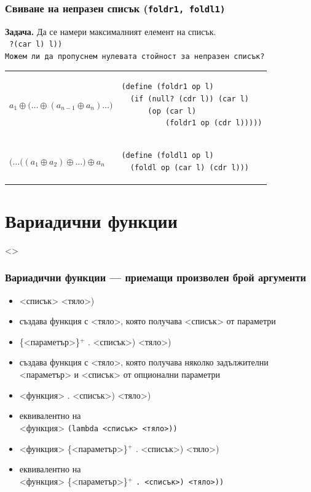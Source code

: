 \documentclass[alsotrans,beameroptions={aspectratio=169}]{beamerswitch}
\begin{document}
\begin{frame}[fragile]
  \frametitle{Свиване на непразен списък (\tt{foldr1, foldl1})}

  \textbf{Задача.} Да се намери максималният елемент на списък.\\
  \pause
  \tt{ ?{(car l)} l))}\\[2ex]
  \pause\pause
  Можем ли да пропуснем нулевата стойност за непразен списък?\\[2ex]
  \begin{tabular}{ll}
    \pause
      $a_1 \oplus \big(\ldots \oplus (a_{n-1} \oplus a_n) \ldots\big)$
    & \pause
\begin{lstlisting}
(define (foldr1 op l)
  (if (null? (cdr l)) (car l)
      (op (car l)
          (foldr1 op (cdr l)))))
\end{lstlisting}\\[6ex]
    \pause
    $\big(\ldots\big((a_1 \oplus a_2) \oplus \ldots\big) \oplus a_n$
    & \pause
\begin{lstlisting}
(define (foldl1 op l)
  (foldl op (car l) (cdr l)))
\end{lstlisting}
  \end{tabular}
\end{frame}

\section{Вариадични функции}

\begin{frame}<>
  \frametitle{Вариадични функции ---  приемащи произволен брой аргументи}

  \begin{itemize}[<+->]
  \item {} <списък> <тяло>\tta)
  \item създава функция с <тяло>, която получава <списък> от параметри
  \item {}\{<параметър>\}$^+$ \tta. <списък>\tta) <тяло>\tta)
  \item създава функция с <тяло>, която получава няколко задължителни <параметър> и <списък> от опционални параметри
  \item {}<функция> \tta. <списък>\tta) <тяло>\tta)
  \item еквивалентно на \\
     <функция> \tt{(lambda }<списък> <тяло>\tt{))}
  \item {}<функция> \{<параметър>\}$^+$ \tta. <списък>\tta) <тяло>\tta)
  \item еквивалентно на \\
     <функция> \{<параметър>\}$^+$ \tt. <списък>\tt) <тяло>\tt{))}
  \end{itemize}
\end{frame}
\end{document}
